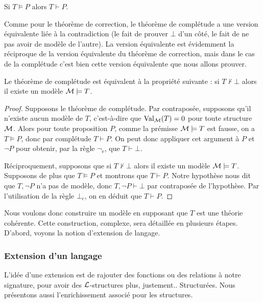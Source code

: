 \begin{them}
    Si $T\vDash P$ alors $T\vdash P$.
\end{them}

Comme pour le théorème de correction, le théorème de complétude a une version équivalente liée à la contradiction (le fait de prouver $\bot$ d'un côté, le fait de ne pas avoir de modèle de l'autre). La version équivalente est évidemment la réciproque de la version équivalente du théorème de correction, mais dans le cas de la complétude c'est bien cette version équivalente que nous allons prouver.

\begin{lem}
    Le théorème de complétude est équivalent à la propriété suivante : si $T\nvdash \bot$ alors il existe un modèle $\mathcal M\models T$.
\end{lem}

\begin{proof}
    Supposons le théorème de complétude. Par contraposée, supposons qu'il n'existe aucun modèle de $T$, c'est-à-dire que $\mathrm{Val}_{\mathcal M}(T)=0$ pour toute structure $\mathcal M$. Alors pour toute proposition $P$, comme la prémisse $\mathcal M\models T$ est fausse, on a $T\vDash P$, donc par complétude $T\vdash P$. On peut donc appliquer cet argument à $P$ et $\lnot P$ pour obtenir, par la règle $\lnot_\mathrm e$, que $T\vdash \bot$.

    Réciproquement, supposons que si $T\nvdash\bot$ alors il existe un modèle $\mathcal M\models T$. Supposons de plus que $T\vDash P$ et montrons que $T\vdash P$. Notre hypothèse nous dit que $T,\lnot P$ n'a pas de modèle, donc $T,\lnot P\vdash \bot$ par contraposée de l'hypothèse. Par l'utilisation de la règle $\bot_\mathrm c$, on en déduit que $T\vdash P$.
\end{proof}

Nous voulons donc construire un modèle en supposant que $T$ est une théorie cohérente. Cette construction, complexe, sera détaillée en plusieurs étapes. D'abord, voyons la notion d'extension de langage.

\subsubsection{Extension d'un langage}

L'idée d'une extension est de rajouter des fonctions ou des relations à notre signature, pour avoir des $\mathcal L$-structures plus, justement.. Structurées. Nous présentons aussi l'enrichissement associé pour les structures.

